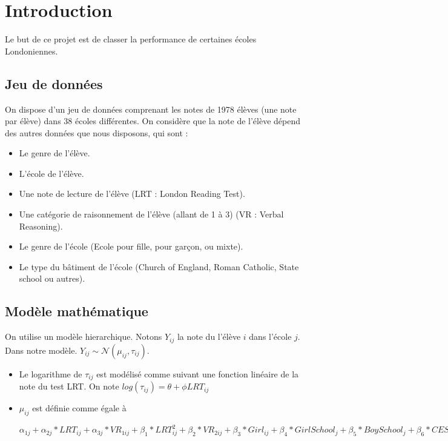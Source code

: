  \section{Introduction}
 Le but de ce projet est de classer la performance de certaines écoles Londoniennes.
 
  \subsection{Jeu de données}
    On dispose d'un jeu de données comprenant les notes de 1978 élèves (une note par élève) dans 38 écoles différentes. On considère que la note de l'élève dépend des autres données que nous disposons, qui sont : 
    \begin{itemize}
        \item Le genre de l'élève.
        \item L'école de l'élève.
        \item Une note de lecture de l'élève (LRT : London Reading Test).
        \item Une catégorie de raisonnement de l'élève (allant de 1 à 3) (VR : Verbal Reasoning).
        
            \item Le genre de l'école (Ecole pour fille, pour garçon, ou mixte).
        \item Le type du bâtiment de l'école (Church of England, Roman Catholic, State school ou autres).
    \end{itemize}
    
    
  \subsection{Modèle mathématique}
    On utilise un modèle hierarchique. Notons $Y_{ij}$ la note du l'élève $i$ dans l'école $j$.
    Dans notre modèle. $Y_{ij} \sim \mathcal{N}( \mu_{ij}, \tau_{ij})$. 
    \begin{itemize}
        \item Le logarithme de $\tau_{ij}$ est modélisé comme suivant une fonction linéaire de la note du test LRT. On note $log (\tau_{ij}) = \theta + \phi LRT_{ij}$
        \item $\mu_{ij}$ est définie comme égale à 
        
        $\alpha_{1j} 
        + \alpha_{2j}* LRT_{ij} 
        + \alpha_{3j}* VR_{1ij} 
        + \beta_{1}* LRT^{2}_{ij} 
        + \beta_{2}* VR_{2ij} 
        + \beta_{3}* Girl_{ij} 
        + \beta_{4}* GirlSchool_{j} 
        + \beta_{5}* BoySchool_{j} 
        + \beta_{6}* CESchool_{j} 
        + \beta_{7}* RCSchool_{j} 
        + \beta_{8}* OtherSchool_{j}$
    \end{itemize}
    
